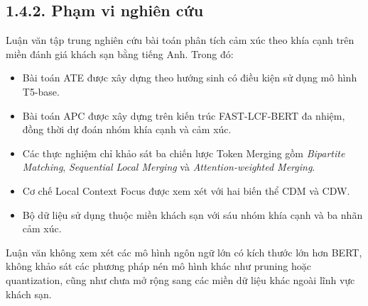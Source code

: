 \subsection{1.4.2. Phạm vi nghiên cứu}

Luận văn tập trung nghiên cứu bài toán phân tích cảm xúc theo khía cạnh trên miền đánh giá khách sạn bằng tiếng Anh. Trong đó:

\begin{itemize}
    \item Bài toán ATE được xây dựng theo hướng sinh có điều kiện sử dụng mô hình T5-base.
    
    \item Bài toán APC được xây dựng trên kiến trúc FAST-LCF-BERT đa nhiệm, đồng thời dự đoán nhóm khía cạnh và cảm xúc.
    
    \item Các thực nghiệm chỉ khảo sát ba chiến lược Token Merging gồm \textit{Bipartite Matching}, \textit{Sequential Local Merging} và \textit{Attention-weighted Merging}.
    
    \item Cơ chế Local Context Focus được xem xét với hai biến thể CDM và CDW.
    
    \item Bộ dữ liệu sử dụng thuộc miền khách sạn với sáu nhóm khía cạnh và ba nhãn cảm xúc.
\end{itemize}

Luận văn không xem xét các mô hình ngôn ngữ lớn có kích thước lớn hơn BERT, không khảo sát các phương pháp nén mô hình khác như pruning hoặc quantization, cũng như chưa mở rộng sang các miền dữ liệu khác ngoài lĩnh vực khách sạn.
 